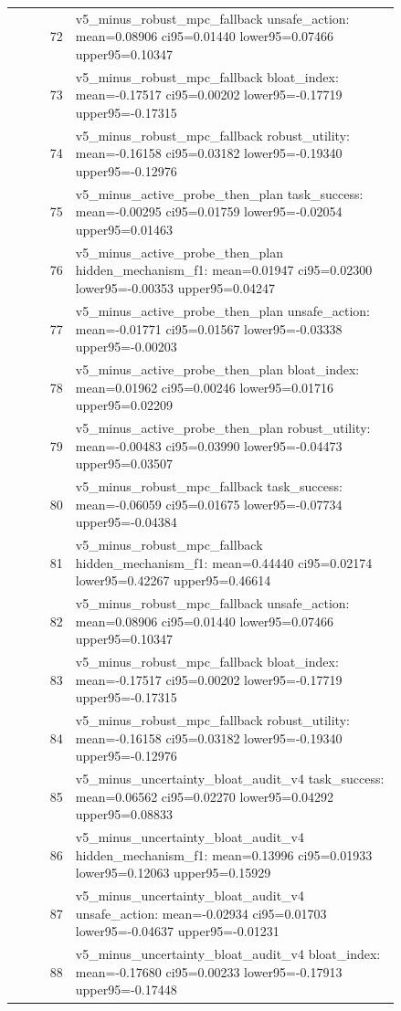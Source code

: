 \documentclass{article}
\begin{document}
\begin{center}
\begin{longtable}{rp{0.84\linewidth}}
72 & v5\_minus\_robust\_mpc\_fallback unsafe\_action: mean=0.08906 ci95=0.01440 lower95=0.07466 upper95=0.10347\\
73 & v5\_minus\_robust\_mpc\_fallback bloat\_index: mean=-0.17517 ci95=0.00202 lower95=-0.17719 upper95=-0.17315\\
74 & v5\_minus\_robust\_mpc\_fallback robust\_utility: mean=-0.16158 ci95=0.03182 lower95=-0.19340 upper95=-0.12976\\
75 & v5\_minus\_active\_probe\_then\_plan task\_success: mean=-0.00295 ci95=0.01759 lower95=-0.02054 upper95=0.01463\\
76 & v5\_minus\_active\_probe\_then\_plan hidden\_mechanism\_f1: mean=0.01947 ci95=0.02300 lower95=-0.00353 upper95=0.04247\\
77 & v5\_minus\_active\_probe\_then\_plan unsafe\_action: mean=-0.01771 ci95=0.01567 lower95=-0.03338 upper95=-0.00203\\
78 & v5\_minus\_active\_probe\_then\_plan bloat\_index: mean=0.01962 ci95=0.00246 lower95=0.01716 upper95=0.02209\\
79 & v5\_minus\_active\_probe\_then\_plan robust\_utility: mean=-0.00483 ci95=0.03990 lower95=-0.04473 upper95=0.03507\\
80 & v5\_minus\_robust\_mpc\_fallback task\_success: mean=-0.06059 ci95=0.01675 lower95=-0.07734 upper95=-0.04384\\
81 & v5\_minus\_robust\_mpc\_fallback hidden\_mechanism\_f1: mean=0.44440 ci95=0.02174 lower95=0.42267 upper95=0.46614\\
82 & v5\_minus\_robust\_mpc\_fallback unsafe\_action: mean=0.08906 ci95=0.01440 lower95=0.07466 upper95=0.10347\\
83 & v5\_minus\_robust\_mpc\_fallback bloat\_index: mean=-0.17517 ci95=0.00202 lower95=-0.17719 upper95=-0.17315\\
84 & v5\_minus\_robust\_mpc\_fallback robust\_utility: mean=-0.16158 ci95=0.03182 lower95=-0.19340 upper95=-0.12976\\
85 & v5\_minus\_uncertainty\_bloat\_audit\_v4 task\_success: mean=0.06562 ci95=0.02270 lower95=0.04292 upper95=0.08833\\
86 & v5\_minus\_uncertainty\_bloat\_audit\_v4 hidden\_mechanism\_f1: mean=0.13996 ci95=0.01933 lower95=0.12063 upper95=0.15929\\
87 & v5\_minus\_uncertainty\_bloat\_audit\_v4 unsafe\_action: mean=-0.02934 ci95=0.01703 lower95=-0.04637 upper95=-0.01231\\
88 & v5\_minus\_uncertainty\_bloat\_audit\_v4 bloat\_index: mean=-0.17680 ci95=0.00233 lower95=-0.17913 upper95=-0.17448\\

\end{longtable}
\end{center}
\end{document}
